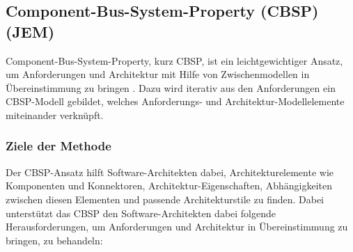 \subsection{Component-Bus-System-Property (CBSP) (JEM)}\label{cbsp}
Component-Bus-System-Property, kurz CBSP, ist ein leichtgewichtiger Ansatz, um Anforderungen und Architektur mit Hilfe von Zwischenmodellen in \"Ubereinstimmung zu bringen \cite{Gru01}. Dazu wird iterativ aus den Anforderungen ein CBSP-Modell gebildet, welches Anforderungs- und Architektur-Modellelemente miteinander verkn\"upft. \\

\subsubsection{Ziele der Methode}

Der CBSP-Ansatz hilft Software-Architekten dabei, Architekturelemente wie Komponenten und Konnektoren, Architektur-Eigenschaften, Abh\"angigkeiten zwischen diesen Elementen und passende Architekturstile zu finden. Dabei unterst\"utzt das CBSP den Software-Architekten dabei folgende Herausforderungen, um Anforderungen und Architektur in \"Ubereinstimmung zu bringen, zu behandeln: \\

